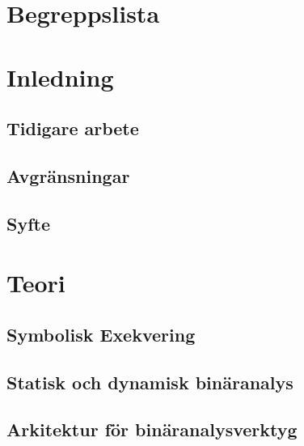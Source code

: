 \documentclass[12pt, a4paper]{report}
\begin{document}


\newpage



\newpage

\tableofcontents
\newpage

\chapter*{Begreppslista}


\newpage


\chapter{Inledning}

\section{Tidigare arbete}

\section{Avgränsningar}

\section{Syfte}


\chapter{Teori}

\section{Symbolisk Exekvering}

\section{Statisk och dynamisk binäranalys}

\section{Arkitektur för binäranalysverktyg}

\end{document}
